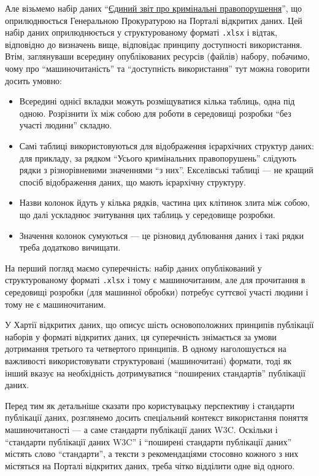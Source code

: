 \documentclass[
]{agujournal2019}
\providecommand{\tightlist}{%
  \setlength{\itemsep}{0pt}\setlength{\parskip}{0pt}}\usepackage{longtable,booktabs,array}
\begin{document}
Але візьмемо набір даних
``\href{https://data.gov.ua/dataset/8b9b1677-2407-454a-bfa7-76eb638c0ea1}{Єдиний
звіт про кримінальні правопорушення}'', що оприлюднюється Генеральною
Прокуратурою на Порталі відкритих даних. Цей набір даних оприлюднюється
у структурованому форматі \texttt{.xlsx} і відтак, відповідно до
визначень вище, відповідає принципу доступності використання. Втім,
заглянуваши всередину опублікованих ресурсів (файлів) набору, побачимо,
чому про ``машиночитаність'' та ``доступність використання'' тут можна
говорити досить умовно:

\begin{itemize}
\tightlist
\item
  Всередині однієї вкладки можуть розміщуватися кілька таблиць, одна під
  одною. Розрізнити їх між собою для роботи в середовищі розробки ``без
  участі людини'' складно.
\item
  Самі таблиці використовуються для відображення ієрархічних структур
  даних: для прикладу, за рядком ``Усього кримінальних правопорушень''
  слідують рядки з різнорівневими значеннями ``з них''. Екселівські
  таблиці --- не кращий спосіб відображення даних, що мають ієрархічну
  структуру.
\item
  Назви колонок йдуть у кілька рядків, частина цих клітинок злита між
  собою, що далі ускладнює зчитування цих таблиць у середовище розробки.
\item
  Значення колонок сумуються --- це різновид дублювання даних і такі
  рядки треба додатково вичищати.
\end{itemize}

На перший погляд маємо суперечність: набір даних опублікований у
структурованому форматі \texttt{.xlsx} і тому є машиночитаним, але для
прочитання в середовищі розробки (для машинної обробки) потребує
суттєвої участі людини і тому не є машиночитаним.

У Хартії відкритих даних, що описує шість основоположних принципів
публікації наборів у форматі відкритих даних, ця суперечність знімається
за умови дотримання третього та четвертого принципів. В одному
наголошується на важливості використовувати структуровані (машиночитані)
формати, тоді як інший вказує на необхідність дотримуватися ``поширених
стандартів'' публікації даних.

Перед тим як детальніше сказати про користувацьку перспективу і
стандарти публікації даних, розглянемо досить спеціальний контекст
використання поняття машиночитаності --- а саме стандарти публікації
даних W3C. Оскільки і ``стандарти публікації даних W3C'' і ``поширені
стандарти публікації даних'' містять слово ``стандарти'', а тексти з
рекомендаціями стосовно кожного з них містяться на Порталі відкритих
даних, треба чітко відділити одне від одного.
\end{document}

